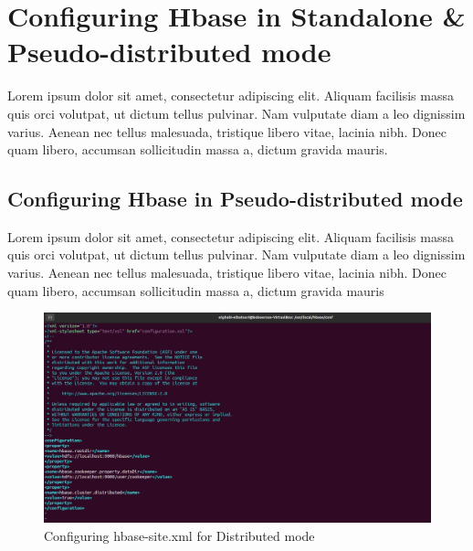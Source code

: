 \chapter{Configuring Hbase in Standalone & Pseudo-distributed mode}
\par Lorem ipsum dolor sit amet, consectetur adipiscing elit. Aliquam facilisis massa quis orci volutpat, ut dictum tellus pulvinar. Nam vulputate diam a leo dignissim varius. Aenean nec tellus malesuada, tristique libero vitae, lacinia nibh. Donec quam libero, accumsan sollicitudin massa a, dictum gravida mauris.
\begin{spacing}{1.2}
\section{Configuring Hbase in Pseudo-distributed mode }
\par Lorem ipsum dolor sit amet, consectetur adipiscing elit. Aliquam facilisis massa quis orci volutpat, ut dictum tellus pulvinar. Nam vulputate diam a leo dignissim varius. Aenean nec tellus malesuada, tristique libero vitae, lacinia nibh. Donec quam libero, accumsan sollicitudin massa a, dictum gravida mauris
\\
\begin{figure}[!htb] 
\begin{center} 
\includegraphics[width=1\linewidth]{Pictures/HBase/Configuring Hbase in Standalone & Pseudo-distributed mode/Configuring Hbase in Pseudo-distributed mode/Configuring hbase-site.xml for Distributed mode} 
\end{center} 
\caption{Configuring hbase-site.xml for Distributed mode} 
\end{figure}  \FloatBarrier
\\


\end{spacing}
